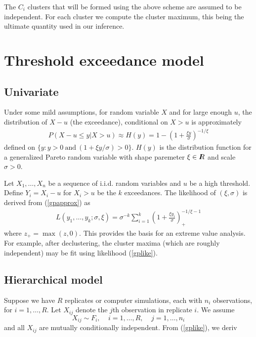 \documentclass[12pt]{article}
\newcommand{\R}{I\hspace{-4.4pt}R}
\begin{document}
The $C_i$ clusters that will be formed using the above scheme are assumed to be independent. For each cluster we compute the cluster maximum, this being the ultimate quantity used in our inference.



\section{Threshold exceedance model}
\label{thresh}

\subsection{Univariate}
\label{univariate}

Under some mild assumptions, for random variable $X$ and for large enough $u$, the distribution of $X-u$ (the exceedance), conditional on $X>u$ is approximately
\begin{align}
P(X-u\leq y|X>u) \approx H(y) = 1 - \left(1+\frac{\xi y}{\sigma}\right)^{-1/\xi} \label{gpapprox}
\end{align}
defined on $\{y:y>0~\mathrm{and}~(1+\xi y/\sigma) >0\}$. $H(y)$ is the distribution function for a generalized Pareto random variable with shape paremeter $\xi\in\R$ and scale $\sigma>0$.

Let $X_1,\ldots,X_n$ be a sequence of i.i.d. random variables and $u$ be a high threshold. Define $Y_i=X_i-u$ for $X_i>u$ be the $k$ exceedances. The likelihood of $(\xi,\sigma)$ is derived from (\ref{gpapprox}) as
\begin{align}
L(y_1,\ldots,y_k;\sigma,\xi)=\sigma^{-k}\sum_{i=1}^k\left(1+\frac{\xi y_i}{\sigma}\right)_+^{-1/\xi-1} \label{gplike}
\end{align}
where $z_+=\max(z,0)$. This provides the basis for an extreme value analysis. For example, after declustering, the cluster maxima (which are roughly independent) may be fit using likelihood (\ref{gplike}).

\subsection{Hierarchical model}
\label{hier}

Suppose we have $R$ replicates or computer simulations, each with $n_i$ observations, for $i=1,\ldots,R$. Let $X_{ij}$ denote the $j$th observation in replicate $i$. We assume
\[ X_{ij} \sim F_i,~~~~~i=1,\ldots,R,~~~~~j=1,\ldots,n_i \]
and all $X_{ij}$ are mutually conditionally independent. From (\ref{gplike}), we deriv
\end{document}
